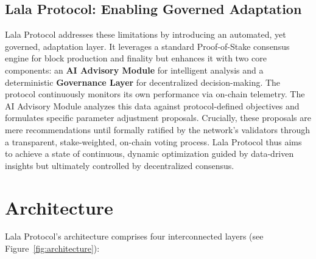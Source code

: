 \documentclass[11pt]{article}
\begin{document}
\subsection{Lala Protocol: Enabling Governed Adaptation}
Lala Protocol addresses these limitations by introducing an automated, yet governed, adaptation layer. It leverages a standard Proof-of-Stake consensus engine for block production and finality but enhances it with two core components: an \textbf{AI Advisory Module} for intelligent analysis and a deterministic \textbf{Governance Layer} for decentralized decision-making. The protocol continuously monitors its own performance via on-chain telemetry. The AI Advisory Module analyzes this data against protocol-defined objectives and formulates specific parameter adjustment proposals. Crucially, these proposals are mere recommendations until formally ratified by the network's validators through a transparent, stake-weighted, on-chain voting process. Lala Protocol thus aims to achieve a state of continuous, dynamic optimization guided by data-driven insights but ultimately controlled by decentralized consensus.

\section{Architecture}
Lala Protocol's architecture comprises four interconnected layers (see Figure~\ref{fig:architecture}):
\end{document}
